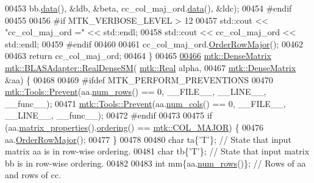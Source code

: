 \begin{DoxyCode}
00453          bb.\hyperlink{classmtk_1_1DenseMatrix_a0c33b8a9e01d157c61ddbdf807c25d84}{data}(), &ldb, &beta, cc\_col\_maj\_ord.\hyperlink{classmtk_1_1DenseMatrix_a0c33b8a9e01d157c61ddbdf807c25d84}{data}(), &ldc);
00454 \textcolor{preprocessor}{  #endif}
00455 
00456 \textcolor{preprocessor}{  #if MTK\_VERBOSE\_LEVEL > 12}
00457   std::cout << \textcolor{stringliteral}{"cc\_col\_maj\_ord ="} << std::endl;
00458   std::cout << cc\_col\_maj\_ord << std::endl;
00459 \textcolor{preprocessor}{  #endif}
00460 
00461   cc\_col\_maj\_ord.\hyperlink{classmtk_1_1DenseMatrix_ac2949efba3e8278335d45418c85433e4}{OrderRowMajor}();
00462 
00463   \textcolor{keywordflow}{return} cc\_col\_maj\_ord;
00464 \}
00465 
\hypertarget{mtk__blas__adapter_8cc_source_l00466}{}\hyperlink{classmtk_1_1BLASAdapter_a0dd80d043615a95f11b7341ce69b44d3}{00466} \hyperlink{classmtk_1_1DenseMatrix}{mtk::DenseMatrix} \hyperlink{classmtk_1_1BLASAdapter_a0dd80d043615a95f11b7341ce69b44d3}{mtk::BLASAdapter::RealDenseSM}(
      \hyperlink{group__c01-roots_gac080bbbf5cbb5502c9f00405f894857d}{mtk::Real} alpha,
00467                                                \hyperlink{classmtk_1_1DenseMatrix}{mtk::DenseMatrix} &aa) \{
00468 
00469 \textcolor{preprocessor}{  #ifdef MTK\_PERFORM\_PREVENTIONS}
00470   \hyperlink{classmtk_1_1Tools_a332324c6f25e66be9dff48c5987a3b9f}{mtk::Tools::Prevent}(aa.\hyperlink{classmtk_1_1DenseMatrix_a53f3afb3b6a8d21854458aaa9663cc74}{num\_rows}() == 0, \_\_FILE\_\_, \_\_LINE\_\_, \_\_func\_\_);
00471   \hyperlink{classmtk_1_1Tools_a332324c6f25e66be9dff48c5987a3b9f}{mtk::Tools::Prevent}(aa.\hyperlink{classmtk_1_1DenseMatrix_a41747502d468c6728a4be31501b16e0e}{num\_cols}() == 0, \_\_FILE\_\_, \_\_LINE\_\_, \_\_func\_\_);
00472 \textcolor{preprocessor}{  #endif}
00473 
00475   \textcolor{keywordflow}{if} (aa.\hyperlink{classmtk_1_1DenseMatrix_a5aa83a0643f27a4652ea97630edf7143}{matrix\_properties}().\hyperlink{classmtk_1_1Matrix_a13cd17621652cd5551ff98549bd94df7}{ordering}() == 
      \hyperlink{namespacemtk_ga622801bd9f912d0f976c3e383f5f581ca7c11989c132253fb76b8f6b1314f7e13}{mtk::COL\_MAJOR}) \{
00476     aa.\hyperlink{classmtk_1_1DenseMatrix_ac2949efba3e8278335d45418c85433e4}{OrderRowMajor}();
00477   \}
00478 
00480   \textcolor{keywordtype}{char} ta\{\textcolor{charliteral}{'T'}\}; \textcolor{comment}{// State that input matrix aa is in row-wise ordering.}
00481   \textcolor{keywordtype}{char} tb\{\textcolor{charliteral}{'T'}\}; \textcolor{comment}{// State that input matrix bb is in row-wise ordering.}
00482 
00483   \textcolor{keywordtype}{int} mm\{aa.\hyperlink{classmtk_1_1DenseMatrix_a53f3afb3b6a8d21854458aaa9663cc74}{num\_rows}()\};  \textcolor{comment}{// Rows of aa and rows of cc.}

\end{DoxyCode}
